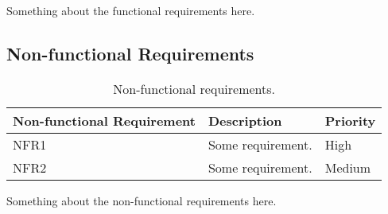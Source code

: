 Something about the functional requirements here.

 \subsection{Non-functional Requirements}

 \begin{table}
 \begin{center}
 \begin{tabular}{| l | l | l |}
 \hline
 Non-functional Requirement & Description & Priority \\
 \hline
 NFR1 & Some requirement. & High \\
 NFR2 & Some requirement. & Medium \\
 \hline
 \end{tabular}
 \caption{Non-functional requirements.}
 \label{table:non-functional-requirements}
 \end{center}
 \end{table}

Something about the non-functional requirements here.
